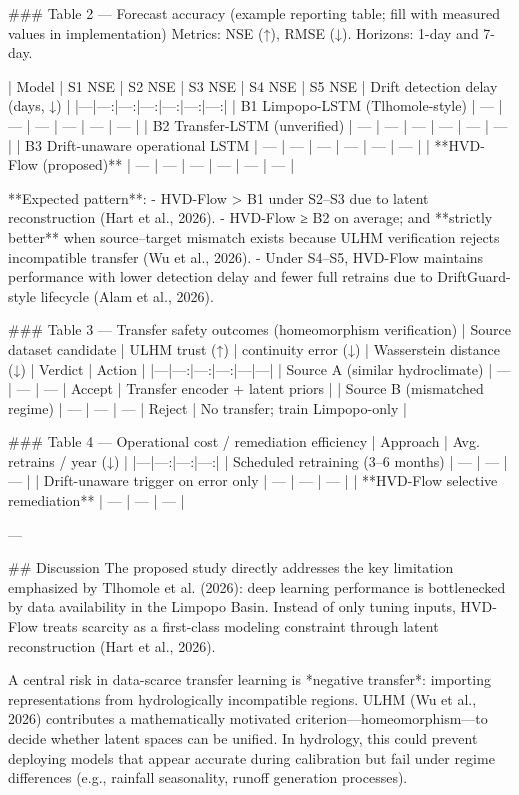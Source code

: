 ### Table 2 — Forecast accuracy (example reporting table; fill with measured values in implementation)  
Metrics: NSE (↑), RMSE (↓). Horizons: 1-day and 7-day.

| Model | S1 NSE | S2 NSE | S3 NSE | S4 NSE | S5 NSE | Drift detection delay (days, ↓) |
|---|---:|---:|---:|---:|---:|---:|
| B1 Limpopo-LSTM (Tlhomole-style) | — | — | — | — | — | — |
| B2 Transfer-LSTM (unverified) | — | — | — | — | — | — |
| B3 Drift-unaware operational LSTM | — | — | — | — | — | — |
| **HVD-Flow (proposed)** | — | — | — | — | — | — |

**Expected pattern**:  
- HVD-Flow > B1 under S2–S3 due to latent reconstruction (Hart et al., 2026).  
- HVD-Flow ≥ B2 on average; and **strictly better** when source–target mismatch exists because ULHM verification rejects incompatible transfer (Wu et al., 2026).  
- Under S4–S5, HVD-Flow maintains performance with lower detection delay and fewer full retrains due to DriftGuard-style lifecycle (Alam et al., 2026).

### Table 3 — Transfer safety outcomes (homeomorphism verification)  
| Source dataset candidate | ULHM trust (↑) | continuity error (↓) | Wasserstein distance (↓) | Verdict | Action |
|---|---:|---:|---:|---|---|
| Source A (similar hydroclimate) | — | — | — | Accept | Transfer encoder + latent priors |
| Source B (mismatched regime) | — | — | — | Reject | No transfer; train Limpopo-only |

### Table 4 — Operational cost / remediation efficiency  
| Approach | Avg. retrains / year (↓) | %
|---|---:|---:|---:|
| Scheduled retraining (3–6 months) | — | — | — |
| Drift-unaware trigger on error only | — | — | — |
| **HVD-Flow selective remediation** | — | — | — |

---

## Discussion  
The proposed study directly addresses the key limitation emphasized by Tlhomole et al. (2026): deep learning performance is bottlenecked by data availability in the Limpopo Basin. Instead of only tuning inputs, HVD-Flow treats scarcity as a first-class modeling constraint through latent reconstruction (Hart et al., 2026).  

A central risk in data-scarce transfer learning is *negative transfer*: importing representations from hydrologically incompatible regions. ULHM (Wu et al., 2026) contributes a mathematically motivated criterion—homeomorphism—to decide whether latent spaces can be unified. In hydrology, this could prevent deploying models that appear accurate during calibration but fail under regime differences (e.g., rainfall seasonality, runoff generation processes).

